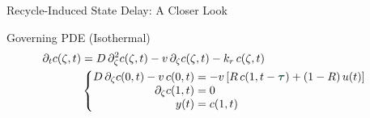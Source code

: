 \documentclass[8pt]{beamer}
\begin{document}
\begin{frame}{Recycle-Induced State Delay: A Closer Look}
\begin{block}{Governing PDE (Isothermal)}
\begin{equation} \label{eq:PDE_original_model}
    \begin{aligned}
        \partial_t{c}(\zeta, t) &= D \, \partial^2_{\zeta} c(\zeta, t) - v \, \partial_{\zeta} c(\zeta, t) - k_r \, c(\zeta, t) \\
        &\begin{cases}
            \begin{aligned}
                D \, \partial_{\zeta} c(0, t) - v \, c(0, t) &= -v \left[ R \, c(1, t - \textcolor{ualberta_darkgreen}{\boldsymbol{\tau}}) + (1 - R) \, u(t) \right] \\
                \partial_{\zeta} c(1, t) &= 0 \\
                y(t) &= c(1, t)
            \end{aligned}
        \end{cases}
    \end{aligned}
\end{equation}
\end{block}
\end{frame}
\end{document}
